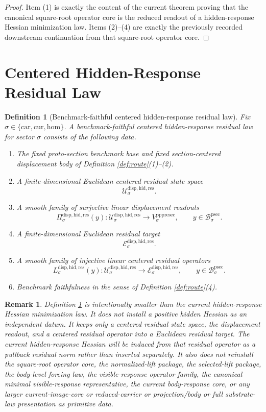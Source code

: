 \documentclass[11pt]{article}
\newcommand{\Car}{\mathrm{car}}
\newcommand{\Cur}{\mathrm{cur}}
\newcommand{\Hom}{\mathrm{hom}}
\newcommand{\ProtoSectionBody}[1]{\mathcal B_{#1}^{\mathrm{psec}}}
\newcommand{\PrePreProtoSectionVertical}[1]{V_{#1}^{\mathrm{pppresec}}}
\newcommand{\ResidualState}[1]{\mathcal U_{#1}^{\mathrm{disp,hid,res}}}
\newcommand{\ResidualTarget}[1]{\mathcal E_{#1}^{\mathrm{disp,hid,res}}}
\newcommand{\ResidualReadout}[1]{\Pi_{#1}^{\mathrm{disp,hid,res}}}
\newcommand{\ResidualOperator}[1]{L_{#1}^{\mathrm{disp,hid,res}}}
\newtheorem{definition}{Definition}
\newtheorem{remark}{Remark}
\begin{document}
\begin{proof}
Item (1) is exactly the content of the current theorem proving that the canonical square-root operator core is the reduced readout of a hidden-response Hessian minimization law. Items (2)--(4) are exactly the previously recorded downstream continuation from that square-root operator core.
\end{proof}

\section{Centered Hidden-Response Residual Law}

\begin{definition}[Benchmark-faithful centered hidden-response residual law]
\label{def:residual}
Fix \(\sigma\in\{\Car,\Cur,\Hom\}\). A \emph{benchmark-faithful centered hidden-response residual law} for sector \(\sigma\) consists of the following data.
\begin{enumerate}
    \item The fixed proto-section benchmark base and fixed section-centered displacement body of Definition \ref{def:route}(1)--(2).
    \item A finite-dimensional Euclidean centered residual state space
    \[
    \ResidualState{\sigma}.
    \]
    \item A smooth family of surjective linear displacement readouts
    \[
    \ResidualReadout{\sigma}(y):
    \ResidualState{\sigma}\to\PrePreProtoSectionVertical{\sigma},
    \qquad
    y\in\ProtoSectionBody{\sigma}.
    \]
    \item A finite-dimensional Euclidean residual target
    \[
    \ResidualTarget{\sigma}.
    \]
    \item A smooth family of injective linear centered residual operators
    \[
    \ResidualOperator{\sigma}(y):
    \ResidualState{\sigma}\to\ResidualTarget{\sigma},
    \qquad
    y\in\ProtoSectionBody{\sigma}.
    \]
    \item Benchmark faithfulness in the sense of Definition \ref{def:route}(4).
\end{enumerate}
\end{definition}

\begin{remark}
Definition \ref{def:residual} is intentionally smaller than the current hidden-response Hessian minimization law. It does not install a positive hidden Hessian as an independent datum. It keeps only a centered residual state space, the displacement readout, and a centered residual operator into a Euclidean residual target. The current hidden-response Hessian will be induced from that residual operator as a pullback residual norm rather than inserted separately. It also does not reinstall the square-root operator core, the normalized-lift package, the selected-lift package, the body-level forcing law, the visible-response operator family, the canonical minimal visible-response representative, the current body-response core, or any larger current-image-core or reduced-carrier or projection/body or full substrate-law presentation as primitive data.
\end{remark}
\end{document}
